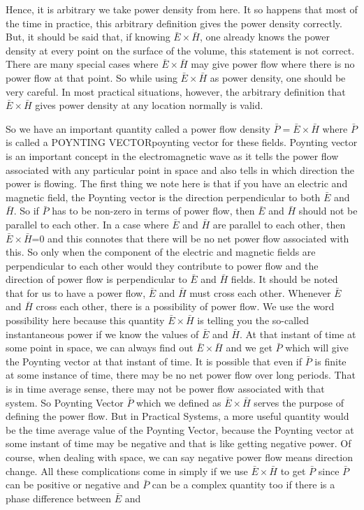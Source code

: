 Hence, it is arbitrary we take power density from here. It so happens that most of the time in practice, this arbitrary definition gives the power density correctly. But, it should be said that, if knowing $\bar{E}\times\bar{H}$, one already knows the power density at every point on the surface of the volume, this statement is not correct. There are many special cases where $\bar{E}\times\bar{H}$  may give power flow where there is no power flow at that point. So while using $\bar{E}\times\bar{H}$  as power density, one should be very careful. In most practical situations, however, the arbitrary definition that $\bar{E}\times\bar{H}$  gives power density at any location normally is valid.

So we have an important quantity called a power flow density $ \bar{P}=\bar{E}\times\bar{H} $ where $  \bar{P}  $ is called a POYNTING VECTORpoynting vector for these fields. Poynting vector is an important concept in the electromagnetic wave as it tells the power flow associated with any particular point in space and also tells in which direction the power is flowing. The first thing we note here is that if you have an electric and magnetic field, the Poynting vector is the direction perpendicular to both $ \bar{E} $ and  $ \bar{H} $. So if $  \bar{P}  $  has to be non-zero in terms of power flow, then $ \bar{E} $ and  $ \bar{H} $ should not be parallel to each other. In a case where  $ \bar{E} $ and  $ \bar{H} $ are parallel to each other, then  $ \bar{E}\times\bar{H} $=0 and this connotes that there will be no net power flow associated with this. So only when the component of the electric and magnetic fields are perpendicular to each other would they contribute to power flow and the direction of power flow is perpendicular to $ \bar{E} $ and  $ \bar{H} $    fields. It should be noted that for us to have a power flow, $ \bar{E} $ and  $ \bar{H} $  must cross each other. Whenever $ \bar{E} $ and  $ \bar{H} $ cross each other, there is a possibility of power flow. We use the word possibility here because this quantity   $ \bar{E}\times\bar{H} $ is telling you the so-called instantaneous power if we know the values of  $ \bar{E} $ and  $ \bar{H} $. At that instant of time at some point in space, we can always find out $ \bar{E}\times\bar{H} $ and we get $  \bar{P}  $ which will give the Poynting vector at that instant of time. It is possible that even if $  \bar{P}  $ is finite at some instance of time, there may be no net power flow over long periods. That is in time average sense, there may not be power flow associated with that system. So Poynting Vector $  \bar{P}  $ which we defined as $ \bar{E}\times\bar{H} $  serves the purpose of defining the power flow. But in Practical Systems, a more useful quantity would be the time average value of the Poynting Vector, because the Poynting vector at some instant of time may be negative and that is like getting negative power. Of course, when dealing with space, we can say negative power flow means direction change. All these complications come in simply if we use $ \bar{E}\times\bar{H} $ to get  $  \bar{P}  $ since $  \bar{P}  $  can be positive or negative and $  \bar{P}  $  can be a complex quantity too if there is a phase difference between $ \bar{E} $ and 